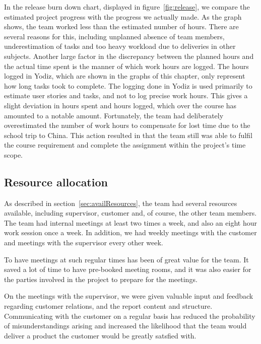 \noindent In the release burn down chart, displayed in figure~\ref{fig:release}, we compare the estimated project progress with the progress we actually made. As the graph shows, the team worked less than the estimated number of hours. There are several reasons for this, including unplanned absence of team members, underestimation of tasks and too heavy workload due to deliveries in other subjects. Another large factor in the discrepancy between the planned hours and the actual time spent is the manner of which work hours are logged. The hours logged in Yodiz, which are shown in the graphs of this chapter, only represent how long tasks took to complete. The logging done in Yodiz is used primarily to estimate user stories and tasks, and not to log precise work hours. This gives a slight deviation in hours spent and hours logged, which over the course has amounted to a notable amount. Fortunately, the team had deliberately overestimated the number of work hours to compensate for lost time due to the school trip to China. This action resulted in that the team still was able to fulfil the course requirement and complete the assignment within the project's time scope.


\subsection{Resource allocation}
As described in section~\ref{sec:availResources}, the team had several resources available, including supervisor, customer and, of course, the other team members. The team had internal meetings at least two times a week, and also an eight hour work session once a week. In addition, we had weekly meetings with the customer and meetings with the supervisor every other week.

To have meetings at such regular times has been of great value for the team. It saved a lot of time to have pre-booked meeting rooms, and it was also easier for the parties involved in the project to prepare for the meetings.

On the meetings with the supervisor, we were given valuable input and feedback regarding customer relations, and the report content and structure. 
Communicating with the customer on a regular basis has reduced the probability of misunderstandings arising and increased the likelihood that the team would deliver a product the customer would be greatly satsfied with. 

